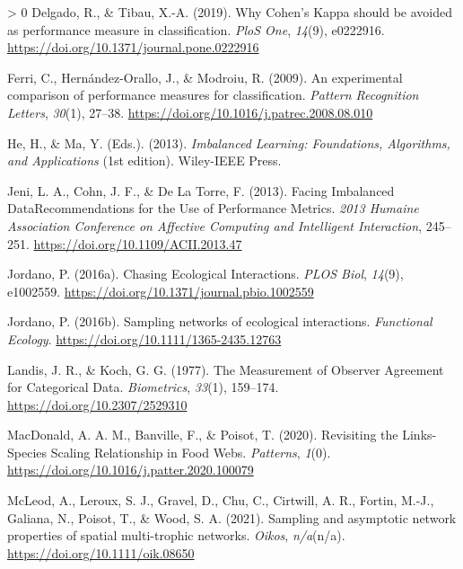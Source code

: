 \documentclass[11pt]{article}
\newlength{\cslhangindent}
\newenvironment{CSLReferences}[3] %
 {%
  \setlength{\parindent}{0pt}
  \ifodd #1 \everypar{\setlength{\hangindent}{\cslhangindent}}\ignorespaces\fi
  \ifnum #2 > 0
  \setlength{\parskip}{#2\baselineskip}
  \fi
 }%
 {}
\begin{document}
\begin{CSLReferences}{1}{0}
\leavevmode\hypertarget{ref-Delgado2019WhyCoh}{}%
Delgado, R., \& Tibau, X.-A. (2019). Why Cohen's Kappa should be avoided
as performance measure in classification. \emph{PloS One}, \emph{14}(9),
e0222916. \url{https://doi.org/10.1371/journal.pone.0222916}

\leavevmode\hypertarget{ref-Ferri2009ExpCom}{}%
Ferri, C., Hernández-Orallo, J., \& Modroiu, R. (2009). An experimental
comparison of performance measures for classification. \emph{Pattern
Recognition Letters}, \emph{30}(1), 27--38.
\url{https://doi.org/10.1016/j.patrec.2008.08.010}

\leavevmode\hypertarget{ref-He2013ImbLea}{}%
He, H., \& Ma, Y. (Eds.). (2013). \emph{Imbalanced Learning:
Foundations, Algorithms, and Applications} (1st edition). Wiley-IEEE
Press.

\leavevmode\hypertarget{ref-Jeni2013FacImb}{}%
Jeni, L. A., Cohn, J. F., \& De La Torre, F. (2013). Facing Imbalanced
DataRecommendations for the Use of Performance Metrics. \emph{2013
Humaine Association Conference on Affective Computing and Intelligent
Interaction}, 245--251. \url{https://doi.org/10.1109/ACII.2013.47}

\leavevmode\hypertarget{ref-Jordano2016ChaEco}{}%
Jordano, P. (2016a). Chasing Ecological Interactions. \emph{PLOS Biol},
\emph{14}(9), e1002559.
\url{https://doi.org/10.1371/journal.pbio.1002559}

\leavevmode\hypertarget{ref-Jordano2016SamNet}{}%
Jordano, P. (2016b). Sampling networks of ecological interactions.
\emph{Functional Ecology}. \url{https://doi.org/10.1111/1365-2435.12763}

\leavevmode\hypertarget{ref-Landis1977MeaObs}{}%
Landis, J. R., \& Koch, G. G. (1977). The Measurement of Observer
Agreement for Categorical Data. \emph{Biometrics}, \emph{33}(1),
159--174. \url{https://doi.org/10.2307/2529310}

\leavevmode\hypertarget{ref-MacDonald2020RevLin}{}%
MacDonald, A. A. M., Banville, F., \& Poisot, T. (2020). Revisiting the
Links-Species Scaling Relationship in Food Webs. \emph{Patterns},
\emph{1}(0). \url{https://doi.org/10.1016/j.patter.2020.100079}

\leavevmode\hypertarget{ref-McLeod2021SamAsy}{}%
McLeod, A., Leroux, S. J., Gravel, D., Chu, C., Cirtwill, A. R., Fortin,
M.-J., Galiana, N., Poisot, T., \& Wood, S. A. (2021). Sampling and
asymptotic network properties of spatial multi-trophic networks.
\emph{Oikos}, \emph{n/a}(n/a). \url{https://doi.org/10.1111/oik.08650}


\end{CSLReferences}
\end{document}
